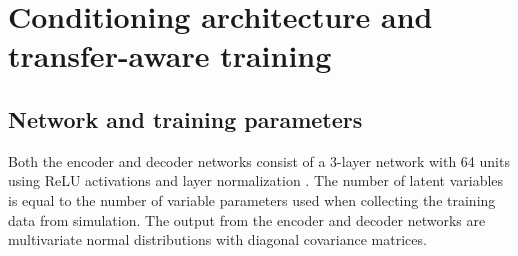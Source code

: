 
        
    
    
        

        
    
    

        
        

\section{Conditioning architecture and transfer-aware training}

\subsection{Network and training parameters}
Both the encoder and decoder networks consist of a 3-layer network with 64 units using ReLU activations and layer normalization \parencite{Ba2016}. The number of latent variables is equal to the number of variable parameters used when collecting the training data from simulation. The output from the encoder and decoder networks are multivariate normal distributions with diagonal covariance matrices.

